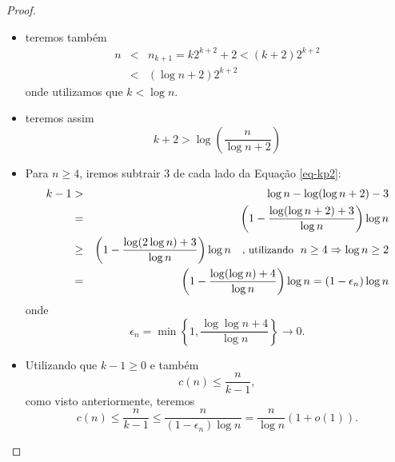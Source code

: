 \begin{frame}[allowframebreaks]
\begin{proof}
	\proofbreak

        \begin{itemize}
	\item teremos também
		\begin{eqnarray}
		n &<& n_{k+1} = k 2^{k+2} + 2 < (k+2) 2^{k+2} \nonumber \\
			&<& (\log n + 2) 2^{k+2} 
		\end{eqnarray}
		onde utilizamos que $k < \log n$.
	\item teremos assim
		\begin{equation}
		k+2 > \log \left( \frac{n}{\log n + 2} \right)
		\label{eq-kp2}
		\end{equation}
	\end{itemize}

	\proofbreak

        \begin{itemize}
        \item Para $n \geq 4$, iremos subtrair 3 de cada lado da Equação \ref{eq-kp2}:
	\vspace{-1em}
	\begin{eqnarray}
	k - 1 &>& \log n - \log( \log n + 2 ) - 3 \nonumber \\
		&=& \left( 1 - \frac{\log( \log n + 2 ) + 3}{\log n} \right) \log n \nonumber \\
		&\geq& \left( 1 - \frac{\log( 2 \log n ) + 3}{\log n} \right) \log n \quad {\small \text{, utilizando \ } n \geq 4 \Rightarrow \log n \geq 2} \nonumber \\
		&=& \left( 1 - \frac{\log( \log n ) + 4}{\log n} \right) \log n = \left( 1 - \epsilon_n \right) \log n 
	\end{eqnarray}
	onde
	\vspace{-1em} 
	\begin{equation}
	\epsilon_n = \min \left\{ 1, \frac{\log \log n + 4}{\log n} \right\} \rightarrow 0 .
	\end{equation}
        \end{itemize}

	\proofbreak

        \begin{itemize}
        \item Utilizando que $k-1 \geq 0$ e também
		\begin{equation}
		c(n) \leq \frac{n}{k-1} ,
		\end{equation}
		como visto anteriormente, teremos 
		\begin{equation}
                c(n) \leq \frac{n}{k-1} \leq \frac{n}{(1 - \epsilon_n)\log n} = \frac{n}{\log n} \left( 1 + o(1) \right) .
		\end{equation}
	\end{itemize}
  \end{proof}
\end{frame}
